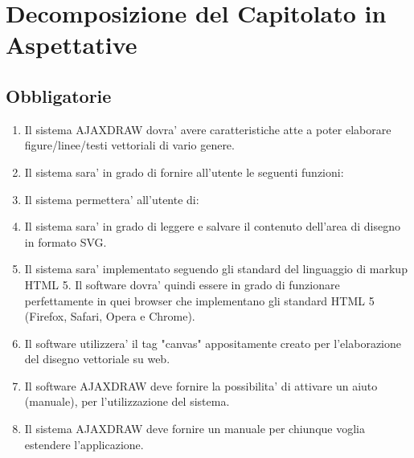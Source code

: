 \newpage

\section{Decomposizione del Capitolato in Aspettative}

\subsection{Obbligatorie}
\begin{enumerate}
\item Il sistema AJAXDRAW dovra' avere caratteristiche atte a poter elaborare figure/linee/testi vettoriali di vario genere.
\item Il sistema sara' in grado di fornire all'utente le seguenti funzioni:


\item Il sistema permettera' all'utente di:


\item Il sistema sara' in grado di leggere e salvare il contenuto dell'area di disegno in formato SVG.
\item Il sistema sara' implementato seguendo gli standard del linguaggio di markup HTML 5. Il software dovra' quindi essere in grado di funzionare perfettamente in quei browser che implementano gli standard HTML 5 (Firefox, Safari, Opera e Chrome). 
\item Il software utilizzera' il tag "canvas" appositamente creato per l'elaborazione del disegno vettoriale su web.
\item Il software AJAXDRAW deve fornire la possibilita' di attivare un aiuto (manuale), per l'utilizzazione del sistema. 
\item Il sistema AJAXDRAW deve fornire un manuale per chiunque voglia estendere l'applicazione. 
\end{enumerate}

